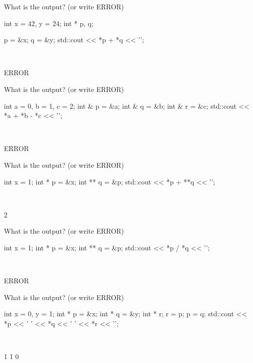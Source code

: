 

\nextq
What is the output? (or write ERROR)
\begin{console}[fontsize=\small]
int x = 42, y = 24;
int * p, q;

p = &x;
q = &y;
std::cout << *p + *q << '\n';
\end{console}
\\ \ANSWER
\begin{answercode}
ERROR
\end{answercode}

\nextq
What is the output? (or write ERROR)
\begin{console}[fontsize=\small]
int a = 0, b = 1, c = 2;
int & p = &a;
int & q = &b;
int & r = &c;
std::cout << *a + *b - *c << '\n';
\end{console}
\\ \ANSWER
\begin{answercode}
ERROR
\end{answercode}

\nextq
What is the output? (or write ERROR)
\begin{console}[fontsize=\small]
int x = 1;
int * p = &x;
int ** q = &p;
std::cout << *p + **q << '\n';
\end{console}
\\ \ANSWER
\begin{answercode}
2
\end{answercode}

\nextq
What is the output? (or write ERROR)
\begin{console}[fontsize=\small]
int x = 1;
int * p = &x;
int ** q = &p;
std::cout << *p / *q << '\n';
\end{console}
\\ \ANSWER
\begin{answercode}
ERROR
\end{answercode}

\nextq
What is the output? (or write ERROR)
\begin{console}[fontsize=\small]
int x = 0, y = 1;
int * p = &x;
int * q = &y;
int * r;
r = p;
p = q;
std::cout << *p << ' ' << *q << ' ' << *r << '\n';
\end{console}
\\ \ANSWER
\begin{answercode}
1 1 0
\end{answercode}

